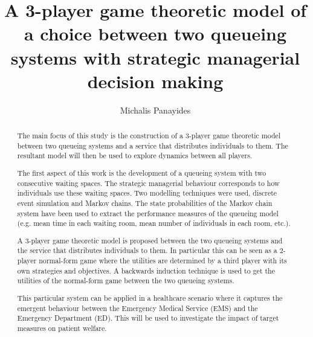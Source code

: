 \documentclass{article}
\title{A 3-player game theoretic model of a choice between two queueing systems with strategic managerial decision making}
\author{Michalis Panayides}
\begin{document}
\maketitle
\begin{abstract}

    The main focus of this study is the construction of a 3-player game 
    theoretic model between two queueing systems and a service that distributes 
    individuals to them. 
    The resultant model will then be used to explore dynamics between all 
    players.

    The first aspect of this work is the development of a queueing system
    with two consecutive waiting spaces. The strategic managerial behaviour corresponds to how individuals use these waiting spaces.
    Two modelling techniques were used, discrete event 
    simulation and Markov chains. 
    The state probabilities of the Markov chain system have been used to extract
    the performance measures of the queueing model (e.g. mean time in each 
    waiting room, mean number of individuals in each room, etc.).
    
    A 3-player game theoretic model is proposed between the two
    queueing systems and the service that distributes individuals to them. 
    In particular this can be seen as a 2-player normal-form game where the 
    utilities are determined by a third player with its own strategies and 
    objectives. 
    A backwards induction technique is used to get the utilities of the 
    normal-form game between the two queueing systems.

    This particular system can be applied in a healthcare scenario where it 
    captures the emergent behaviour between the Emergency Medical Service 
    (EMS) and the Emergency Department (ED). 
    This will be used to investigate the impact of target measures on patient welfare.
    
\end{abstract}
    
\end{document}
